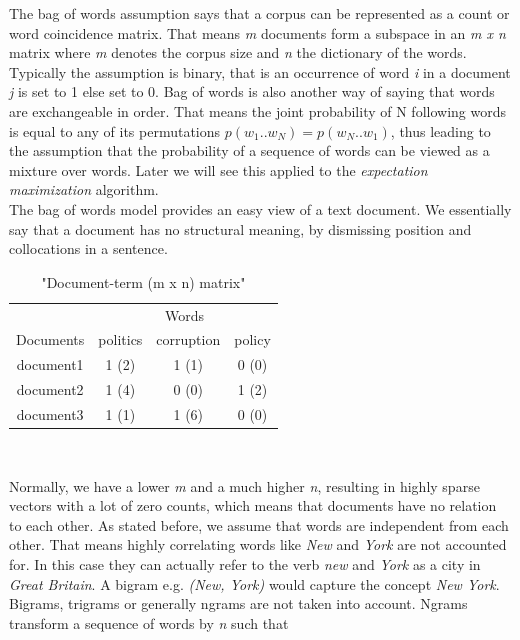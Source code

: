     The bag of words assumption says that a corpus can be represented as a count or word coincidence matrix. That means \emph{m} documents form a subspace in an \emph{m x n} matrix where \emph{m} denotes the corpus size and \emph{n} the dictionary of the words. Typically the assumption is binary, that is an occurrence of word \emph{i} in a document \emph{j} is set to 1 else set to 0. Bag of words is also another way of saying that words are exchangeable in order. That means the joint probability of N following words is equal to any of its permutations $p(w_1..w_N) = p(w_N..w_1)$, thus leading to the assumption that the probability of a sequence of words can be viewed as a mixture over words. Later we will see this applied to the \emph{expectation maximization} algorithm.\\
    The bag of words model provides an easy view of a text document. We essentially say that a document has no structural meaning, by dismissing position and collocations in a sentence. \cite[chp. 20]{NLPBookJurafsky2000}

    \begin{table}[h!]
      \centering
      \begin{tabular}{c|c|c|c}
        \multicolumn{1}{r|}{} & \multicolumn{3}{c}{Words} \\
        \cline{1-4}
        Documents &   politics &   corruption &  policy  \\
        \hline
        document1 &    1 (2)   &     1 (1)    &   0 (0)  \\
        document2 &    1 (4)   &     0 (0)    &   1 (2)  \\
        document3 &    1 (1)   &     1 (6)    &   0 (0)  \\
      \end{tabular}\\
      \caption{"Document-term (m x n) matrix"}
    \end{table}

    Normally, we have a lower \emph{m} and a much higher \emph{n}, resulting in highly sparse vectors with a lot of zero counts, which means that documents have no relation to each other. As stated before, we assume that words are independent from each other. That means highly correlating words like \emph{New} and \emph{York} are not accounted for. In this case they can actually refer to the verb \emph{new} and \emph{York} as a city in \emph{Great Britain}. A bigram e.g. \emph{(New, York)} would capture the concept \emph{New York}. Bigrams, trigrams or generally ngrams are not taken into account. Ngrams transform a sequence of words by \emph{n} such that 


